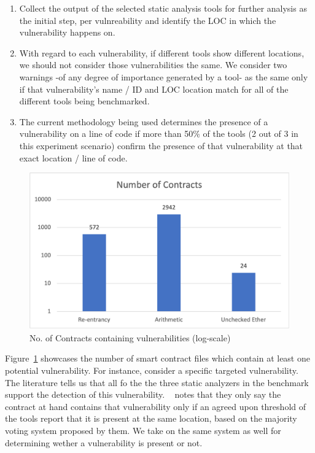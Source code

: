	\begin{enumerate}
	
	\item Collect the output of the selected static analysis tools for further analysis as the initial step, per vulnreability and identify the LOC in which the vulnerability happens on.
	
	\item With regard to each vulnerability, if different tools show different locations, we should not consider those vulnerabilities the same.
		We consider two warnings -of any degree of importance generated by a tool- as the same only if that vulnerability's name / ID and LOC location match for all of the different tools being benchmarked.
	
	\item The current methodology being used determines the presence of a vulnerability on a line of code if more than 50\% of the tools (2 out of 3 in this experiment scenario) confirm the presence of that vulnerability at that exact location / line of code.
	
	\end{enumerate}
	
	\begin{figure}[t]
		\centering
		\includegraphics[width=1\textwidth]{figures/Picture1.png}
		\caption{No. of Contracts containing vulnerabilities (log-scale)}
		\label{fig:chart_vuln_count}
	\end{figure}
		
		Figure~\ref{fig:chart_vuln_count} showcases the number of smart contract files which contain at least one potential vulnerability.
		For instance, consider a specific targeted vulnerability.
		The literature tells us that all fo the the three static analyzers in the benchmark support the detection of this vulnerability.
		~\cite{yashavant2022scrawld} notes that they only say the contract at hand contains that vulnerability only if an agreed upon threshold of the tools report that it is present at the same location,
		based on the majority voting system proposed by them. We take on the same system as well for determining wether a vulnerability is present or not.


